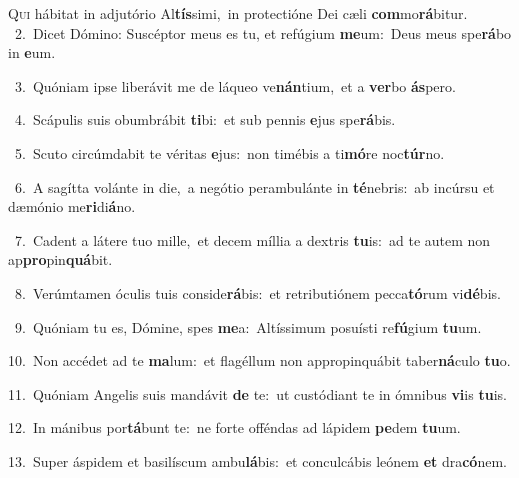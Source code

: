 \lettrine{\initial\textcolor{\initialcolor}{Q}}{ui} hábitat in adjutório Al\-\textbf{tís}\-simi,~\star in protectióne Dei cæli \textbf{com}\-mo\-\textbf{rá}\-bitur.\\
{\numbfont\textcolor{\numbcolor}{~2.}}~Dicet Dómino: Suscéptor meus es tu, et refúgium \textbf{me}\-um:~\star Deus meus spe\-\textbf{rá}\-bo in \textbf{e}\-um.\par
{\numbfont\textcolor{\numbcolor}{~3.}}~Quóniam ipse liberávit me de láqueo ve\-\textbf{nán}\-tium,~\star et a \textbf{ver}\-bo \textbf{ás}\-pero.\par
{\numbfont\textcolor{\numbcolor}{~4.}}~Scápulis suis obumbrábit \textbf{ti}\-bi:~\star et sub pennis \textbf{e}\-jus spe\-\textbf{rá}\-bis.\par
{\numbfont\textcolor{\numbcolor}{~5.}}~Scuto circúmdabit te véritas \textbf{e}\-jus:~\star non timébis a ti\-\textbf{mó}\-re noc\-\textbf{túr}\-no.\par
{\numbfont\textcolor{\numbcolor}{~6.}}~A sagítta volánte in die,~\dagger a negótio perambulánte in \textbf{té}\-nebris:~\star ab incúrsu et dæmónio me\-\textbf{ri}\-di\-\textbf{á}\-no.\par
{\numbfont\textcolor{\numbcolor}{~7.}}~Cadent a látere tuo mille,~\dagger et decem míllia a dextris \textbf{tu}\-is:~\star ad te autem non ap\-\textbf{pro}\-pin\-\textbf{quá}\-bit.\par
{\numbfont\textcolor{\numbcolor}{~8.}}~Verúmtamen óculis tuis conside\-\textbf{rá}\-bis:~\star et retributiónem pecca\-\textbf{tó}\-rum vi\-\textbf{dé}\-bis.\par
{\numbfont\textcolor{\numbcolor}{~9.}}~Quóniam tu es, Dómine, spes \textbf{me}\-a:~\star Altíssimum posuísti re\-\textbf{fú}\-gium \textbf{tu}\-um.\par
{\numbfont\textcolor{\numbcolor}{10.}}~Non accédet ad te \textbf{ma}\-lum:~\star et flagéllum non appropinquábit taber\-\textbf{ná}\-culo \textbf{tu}\-o.\par
{\numbfont\textcolor{\numbcolor}{11.}}~Quóniam Angelis suis mandávit \textbf{de} te:~\star ut custódiant te in ómnibus \textbf{vi}\-is \textbf{tu}\-is.\par
{\numbfont\textcolor{\numbcolor}{12.}}~In mánibus por\-\textbf{tá}\-bunt te:~\star ne forte offéndas ad lápidem \textbf{pe}\-dem \textbf{tu}\-um.\par
{\numbfont\textcolor{\numbcolor}{13.}}~Super áspidem et basilíscum ambu\-\textbf{lá}\-bis:~\star et conculcábis leónem \textbf{et} dra\-\textbf{có}\-nem.\par
